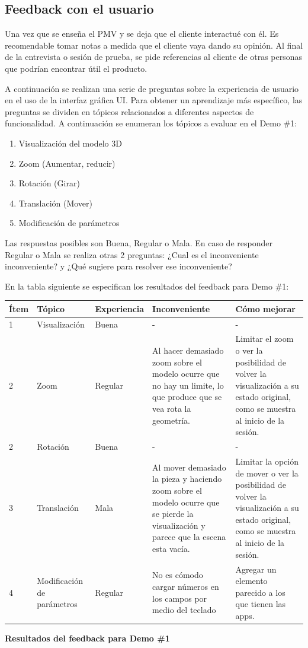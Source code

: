 \subsection{Feedback con el usuario}
Una vez que se enseña el PMV y se deja que el cliente interactué con él. Es recomendable tomar notas a medida que el cliente vaya dando su opinión. Al final de la entrevista o sesión de prueba, se pide referencias al cliente de otras personas que podrían encontrar útil el producto.

A continuación se realizan una serie de preguntas sobre la experiencia de usuario en el uso de la interfaz gráfica UI. 
Para obtener un aprendizaje más específico, las preguntas se dividen en tópicos relacionados a diferentes aspectos de funcionalidad. A continuación se enumeran los tópicos a evaluar en el Demo \#1:
\begin{enumerate}
    \item Visualización del modelo 3D
    \item Zoom (Aumentar, reducir)
    \item Rotación (Girar)
    \item Translación (Mover)
    \item Modificación de parámetros
\end{enumerate}
Las respuestas posibles son Buena, Regular o Mala. En caso de responder Regular o Mala se realiza otras 2 preguntas: ¿Cual es el inconveniente inconveniente? y ¿Qué sugiere para resolver ese inconveniente?

En la tabla siguiente se especifican los resultados del feedback para Demo \#1:

\begin{tabular}{ |p{0.8cm}|p{2.3cm}|p{2.2cm}|p{3.6cm}|p{3.6cm}| }
\hline
     Ítem & Tópico & Experiencia  & Inconveniente & Cómo mejorar\\
\hline
1 & Visualización & Buena & - & -\\
\hline
2 & Zoom & Regular & Al hacer demasiado zoom sobre el modelo ocurre que no hay un limite, lo que produce que se vea rota la geometría. & Limitar el zoom o ver la posibilidad de volver la visualización a su estado original, como se muestra al inicio de la sesión.\\
\hline
2 & Rotación & Buena & - & -\\
\hline
3 & Translación & Mala & Al mover demasiado la pieza y haciendo zoom sobre el modelo ocurre que se pierde la visualización y parece que la escena esta vacía. & Limitar la opción de mover o ver la posibilidad de volver la visualización a su estado original, como se muestra al inicio de la sesión.\\
\hline
4 & Modificación de parámetros & Regular & No es cómodo cargar números en los campos por medio del teclado & Agregar un elemento parecido a los que tienen las apps.\\
\hline
\end{tabular}
\begin{center}
    \caption{\textbf{ \footnotesize{Resultados del feedback para Demo \#1}}}
\end{center}

